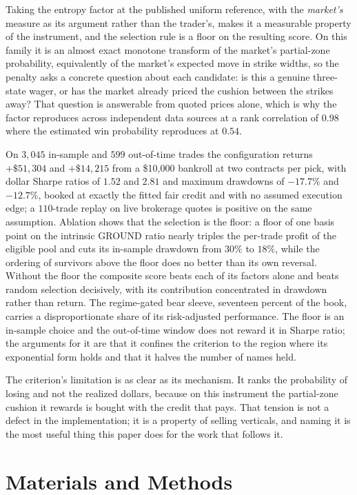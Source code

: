 \documentclass[11pt]{article}
\begin{document}
Taking the entropy factor at the published uniform reference, with the
\emph{market's} measure as its argument rather than the trader's, makes it a
measurable property of the instrument, and the selection rule is a floor on
the resulting score. On this family it is an almost exact
monotone transform of the market's partial-zone probability, equivalently of
the market's expected move in strike widths, so the penalty asks a concrete
question about each candidate: is this a genuine three-state wager, or has the
market already priced the cushion between the strikes away? That question is
answerable from quoted prices alone, which is why the factor reproduces across
independent data sources at a rank correlation of $0.98$ where the estimated
win probability reproduces at $0.54$.

On $3{,}045$ in-sample and $599$ out-of-time trades the configuration returns
$+\$51{,}304$ and $+\$14{,}215$ from a \$10{,}000 bankroll at two contracts
per pick, with dollar Sharpe ratios of $1.52$ and $2.81$ and maximum drawdowns
of $-17.7\%$ and $-12.7\%$, booked at exactly the fitted fair credit and with
no assumed execution edge; a $110$-trade replay on live brokerage quotes is
positive on the same assumption. Ablation shows that the selection is the
floor: a floor of one basis point on the intrinsic GROUND ratio nearly triples
the per-trade profit of the eligible pool and cuts its in-sample drawdown from
$30\%$ to $18\%$, while the
ordering of survivors above the floor does no better than its own reversal.
Without the floor the composite score beats each of its factors alone and
beats random selection decisively, with its contribution concentrated in
drawdown rather than return. The regime-gated bear sleeve, seventeen percent of
the book, carries a disproportionate share of its risk-adjusted performance.
The floor is an in-sample choice and the out-of-time window does not reward it
in Sharpe ratio; the arguments for it are that it confines the criterion to
the region where its exponential form holds and that it halves the number of
names held.

The criterion's limitation is as clear as its mechanism. It ranks the
probability of losing and not the realized dollars, because on this instrument
the partial-zone cushion it rewards is bought with the credit that pays. That
tension is not a defect in the implementation; it is a property of selling
verticals, and naming it is the most useful thing this paper does for the work
that follows it.

\section*{Materials and Methods}
\end{document}
